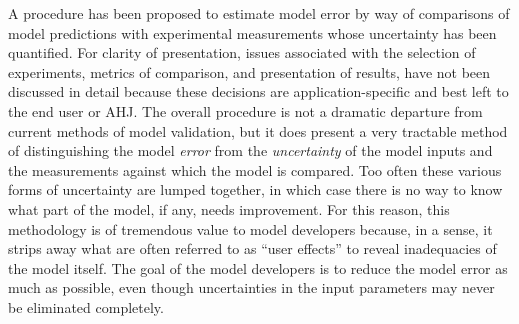 A procedure has been proposed to estimate model error by way of comparisons of model predictions with experimental measurements whose uncertainty has been
quantified. For clarity of presentation, issues associated with the selection of experiments, metrics of comparison, and presentation of results, have not been
discussed in detail because these decisions are application-specific and best left to the end user or AHJ. The overall procedure is not a dramatic departure from current
methods of model validation, but it does present a very tractable method of distinguishing the model {\em error} from the {\em uncertainty} of the model inputs and the measurements
against which the model is compared. Too often these various forms of uncertainty are lumped together, in which case there is no way to know what part of the model, if
any, needs improvement. For this reason, this methodology is of tremendous value to model developers because, in a sense, it strips away what are often referred to as
``user effects'' to reveal inadequacies of the model itself. The goal of the model developers is to reduce the model error as much as possible, even though
uncertainties in the input parameters may never be eliminated completely.

